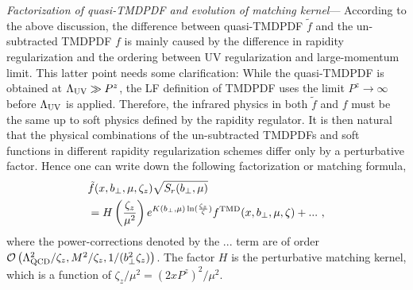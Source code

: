 \documentclass[twocolumn,aps,prd,preprintnumbers,superscriptaddress,10pt]{revtex4-1}
\begin{document}
{\it Factorization of quasi-TMDPDF and evolution of matching kernel}---
According to the above discussion, the difference between quasi-TMDPDF $\tilde f$
and the un-subtracted TMDPDF $f$ is mainly caused by the difference in
rapidity regularization and the ordering between UV regularization and
large-momentum limit. This latter point needs some clarification:
While the quasi-TMDPDF is obtained at $\Lambda_{\rm UV} \gg P^z$,
the LF definition of TMDPDF uses the limit $P^z\to \infty$ before $\Lambda_{\rm UV}$ is applied.
Therefore, the infrared physics in both $\tilde f$ and $f$ must be the same up to soft physics defined
by the rapidity regulator. It is then natural that the physical combinations
of the un-subtracted TMDPDFs and soft functions in different rapidity
regularization schemes differ only by
a perturbative factor. Hence one can write down
the following factorization or matching formula,
\begin{align}\label{eq:factorization}
&\tilde f(x,b_\perp,\mu,\zeta_z)\sqrt{S_r(b_\perp,\mu)}\nonumber \\
&=H\left(\frac{\zeta_z}{\mu^2}\right) e^{K(b_\perp,\mu)\ln (\frac{\zeta_z}{\zeta})}f^{\rm TMD}(x,b_\perp,\mu,\zeta)+...\ ,
\end{align}
where the power-corrections denoted by the $...$ term are of order ${\cal O}\left(\Lambda_{\rm QCD}^2/\zeta_z,M^2/\zeta_z,1/(b^2_\perp\zeta_z) \right)$. The factor $H$ is the perturbative matching kernel, which is a function of $\zeta_z/\mu^2=(2xP^z)^2/\mu^2$.
\end{document}
